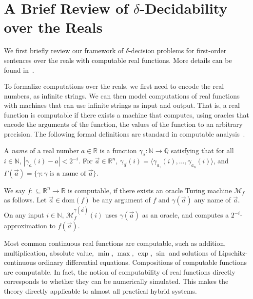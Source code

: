 \documentclass[envcountsect]{llncs}
\newcommand{\dom}{\mathrm{dom}}
\begin{document}
\section{A Brief Review of $\delta$-Decidability over the Reals}\label{review}

We first briefly review our framework of $\delta$-decision problems for
first-order sentences over the reals with computable real functions. More
details can be found in~\cite{}. 

To formalize computations over the reals, we first need to encode the real
numbers, as infinite strings. We can then model computations of real functions
with machines that can use infinite strings as input and output. That is, a real
function is computable if there exists a machine that computes, using oracles
that encode the arguments of the function, the values of the function to an
arbitrary precision. The following formal definitions are standard in 
computable
analysis~\cite{CAbook}.
\begin{definition}
A {\em name} of a real number $a\in \mathbb{R}$ is a function
$\mathcal{\gamma}_a: \mathbb{N}\rightarrow \mathbb{Q}$ satisfying that for all
$i\in \mathbb{N}$, $|\gamma_a(i) - a|<2^{-i}.$ For $\vec a\in \mathbb{R}^n$,
$\gamma_{\vec a}(i) = \langle \gamma_{a_1}(i), ..., \gamma_{a_n}(i)\rangle$, and
$\Gamma(\vec a) = \{\gamma: \gamma\mbox{ is a name of }\vec a\}$.
\end{definition}
\begin{definition} We say
$f:\subseteq\mathbb{R}^n\rightarrow \mathbb{R}$ is computable, if there exists
an oracle Turing machine $\mathcal{M}_f$ as follows. Let $\vec a\in
\dom(f)$ be any argument of $f$ and $\gamma(\vec a)$
any name of $\vec a$. On any input $i\in \mathbb{N}$,
$\mathcal{M}_f^{\gamma(\vec a)}(i)$ uses $\gamma(\vec a)$ as an oracle, and
computes a $2^{-i}$-approximation to $f(\vec a)$.
\end{definition}

Most common continuous real functions are computable, such as addition,
multiplication,  absolute value, $\min$, $\max$, $\exp$, $\sin$ and solutions of
Lipschitz-continuous ordinary differential equations. Compositions
of computable functions are computable. In fact, the notion of computability of
real functions directly corresponds to whether they can be numerically
simulated. This makes the theory directly applicable to almost all practical
hybrid systems. 
\end{document}
